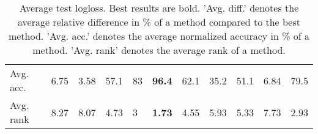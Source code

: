 \begin{table}[ht!]
\begin{tabular}{lllllllllll}
  Avg. acc. & 6.75 & 3.58 & 57.1 & 83 & \textbf{96.4} & 62.1 & 35.2 & 51.1 & 6.84 & 79.5 \\ 
  Avg. rank & 8.27 & 8.07 & 4.73 & 3 & \textbf{1.73} & 4.55 & 5.93 & 5.33 & 7.73 & 2.93 \\ 
   \hline
\hline
\end{tabular}
\endgroup
\caption{Average test logloss. 
                  Best results are bold. 
                  'Avg. diff.' denotes the average relative difference in \% of a method compared to the best method.
                  'Avg. acc.' denotes the average normalized accuracy in \% of a method.
                  'Avg. rank' denotes the average rank of a method.} 
\label{TABLES/table_results_logloss_clustering}
\end{table}
